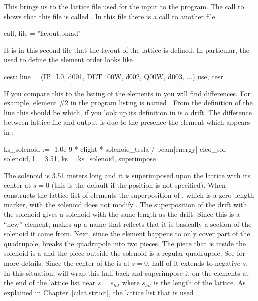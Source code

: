 {{{{{{{{{This brings us to the lattice file used for the input to the program.
The call to  shows that this file is called 
.
In this file there is a call to another file
  \begin{example}
  call, file = "layout.bmad"
  \end{example}
It is in this second file
that the layout of the lattice is defined. In particular, the  used
to define the element order looks like
\begin{example}
  cesr: line = (IP_L0, d001, DET_00W, d002, Q00W, d003, ...)
  use, cesr
\end{example}
If you compare this to the listing of the elements in
 you will find differences. For example, element
\#2 in the program listing is named . From the
definition of the  line this should be  which, if
you look up its definition in  is a drift.  The
difference between lattice file and output is due to the presence
the  element which appears in :
\begin{example}
  ks_solenoid    := -1.0e-9 * clight * solenoid_tesla / beam[energy]
  cleo_sol: solenoid, l = 3.51, ks = ks_solenoid, superimpose 
\end{example}
The solenoid is 3.51 meters long
and it is superimposed upon the lattice with its center at $s = 0$ (this
is the default if the position is not specified). 
When  constructs the lattice list of elements
the superposition of , which is a zero--length marker, with the
solenoid does not modify . The superposition of the
 drift with the solenoid gives a solenoid with the same
length as the drift. Since this is a ``new'' element, 
makes up a name that reflects that it is basically a section of the
solenoid it came from.  Next, since the  element happens to
only cover
part of the  quadrupole,  breaks the
quadrupole into two pieces. The piece that is inside the solenoid is a
 and the piece outside the solenoid is a regular
quadrupole. See  for more details. Since the
center of the  is at $s = 0$, half of it extends to
negative $s$. In this situation,  will wrap this half
back and superimpose it on the elements at the end of the lattice list
near $s = s_{lat}$ where $s_{lat}$ is the length of the lattice.  As
explained in Chapter~\ref{c:lat.struct}, the lattice list that is used
}}}}}}}}}
